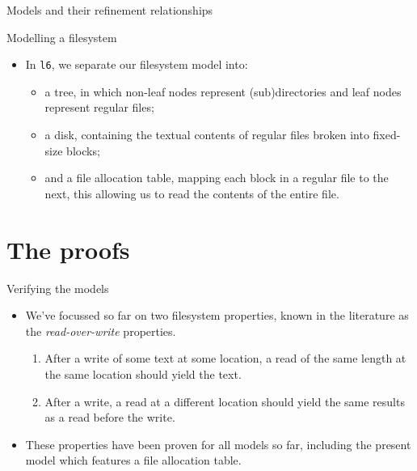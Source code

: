 \documentclass{beamer}
\begin{document}
\begin{frame}{Models and their refinement relationships}
\end{frame}

\begin{frame}{Modelling a filesystem}
  \begin{itemize}
  \item In \texttt{l6}, we separate our filesystem model into:
    \begin{itemize}
    \item a tree, in which non-leaf nodes represent (sub)directories
      and leaf nodes represent regular files;
    \item a disk, containing the textual contents of regular files
      broken into fixed-size blocks;
    \item and a file allocation table, mapping each block in a regular
      file to the next, this allowing us to read the contents of the
      entire file.
    \end{itemize}
  \end{itemize}
\end{frame}

\section{The proofs}

\begin{frame}{Verifying the models}
  \begin{itemize}
  \item We've focussed so far on two filesystem properties, known in
    the literature as the \textit{read-over-write} properties.
    \begin{enumerate}
    \item After a write of some text at some location, a read of the
      same length at the same location should yield the text.
    \item After a write, a read at a different location should yield
      the same results as a read before the write.
    \end{enumerate}
  \item These properties have been proven for all models so far,
    including the present model which features a file allocation
    table.
  \end{itemize}
\end{frame}
\end{document}
